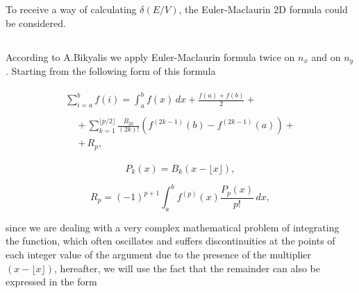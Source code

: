 \documentclass[twoside, 10pt]{article}
\def\myvspacebeforesubsection{-2.0mm}
\def\myvspaceaftersubsection{-2.5mm}
\begin{document}
\begin{multicols}{2}
    To receive a way of calculating \(\delta\left(E/V\right)\), the Euler-Maclaurin 2D formula
could be considered.


\vspace{\myvspacebeforesubsection}
\subsection*{} \label{eulermaclaurin-2d-formula}
\vspace{\myvspaceaftersubsection}


According to A.Bikyalis \cite{Bikyalis1968} we apply Euler-Maclaurin
formula twice on \(n_x\) and on \(n_y\). Starting from the following form of this formula


    \begin{equation} \label{eq:7}
\begin{array}{l}
\begin{array}{ll}
\displaystyle \sum _{i=a}^{b}f(i)= \int_{a}^{b}f(x)\,dx+{\frac {f(a)+f(b)}{2}} + & \,\,\,\,
\end{array}  \\
\begin{array}{rr}
\,\,\, & +\,\sum_{k=1}^{\lfloor p/2\rfloor }{\frac {B_{2k}}{(2k)!}}\left(f^{(2k-1)}(b)-f^{(2k-1)}(a)\right)+ \\
\,\,\, & + \,R_{p},
\end{array}
\end{array}\end{equation}

\begin{equation} \label{eq:8}
{\displaystyle P_{k}(x)=B_{k}\left(x-\lfloor x\rfloor \right),}
\end{equation}

\begin{equation} \label{eq:9}
{\displaystyle R_{p}=(-1)^{p+1}\int_{a}^{b}f^{(p)}(x){\frac {P_{p}(x)}{p!}}\,dx},
\end{equation}

since we are dealing with a very complex mathematical
problem of integrating the function, which often oscillates and
suffers discontinuities at the points of each integer value of the
argument due to the presence of the multiplier \((x-\lfloor x\rfloor )\), hereafter,
we will use the fact that the remainder can also
be expressed in the form


\end{multicols}
\end{document}
